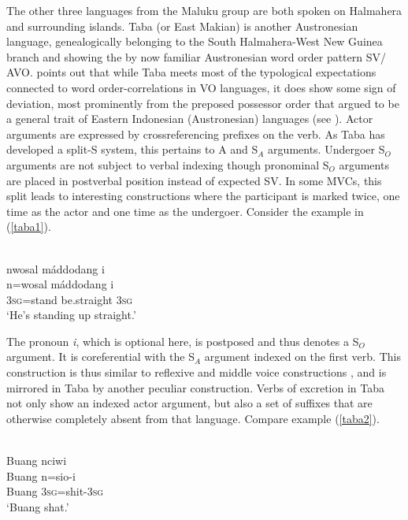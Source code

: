 The other three languages from the Maluku group are both spoken on Halmahera and surrounding islands. Taba (or East Makian) is another Austronesian language, genealogically belonging to the South Halmahera-West New Guinea branch and showing the by now familiar Austronesian word order pattern SV/ AVO. \citet[144f.]{bowden2001taba} points out that while Taba meets most of the typological expectations connected to word order-correlations in VO languages, it does show some sign of deviation, most prominently from the preposed possessor order that \citet{Himmelmann2005austronesian} argued to be a general trait of Eastern Indonesian (Austronesian) languages (see ). Actor arguments are expressed by crossreferencing prefixes on the verb. As Taba has developed a split-S system, this pertains to A and S$_A$ arguments. Undergoer S$_O$ arguments are not subject to verbal indexing though pronominal S$_O$ arguments are placed in postverbal position instead of expected SV. In some MVCs, this split leads to interesting constructions where the participant is marked twice, one time as the actor and one time as the undergoer. Consider the example in (\ref{taba1}).

\ea \label{taba1}
\\
\glll nwosal máddodang i \\
n=wosal máddodang i \\
\textsc{3}\textsc{sg}=stand be.straight \textsc{3}\textsc{sg} \\
\glft `He's standing up straight.'  
\z

The pronoun \textit{i}, which is optional here, is postposed and thus denotes a S$_O$ argument. It is coreferential with the S$_A$ argument indexed on the first verb. This construction is thus similar to reflexive and middle voice constructions \citep[301]{bowden2001taba}, and is mirrored in Taba by another peculiar construction. Verbs of excretion in Taba not only show an indexed actor argument, but also a set of suffixes that are otherwise completely absent from that language. Compare example (\ref{taba2}).

\ea \label{taba2}
\\
\glll Buang nciwi \\
Buang n=sio-i \\
Buang \textsc{3}\textsc{sg}=shit-\textsc{3}\textsc{sg} \\
\glft `Buang shat.' 
\z

